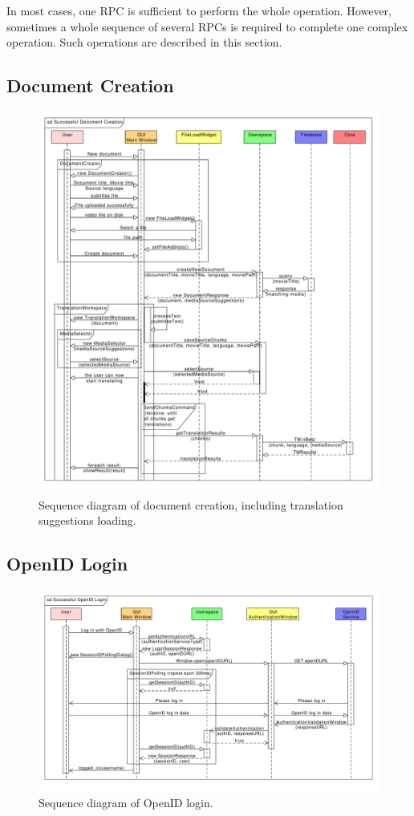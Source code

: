 In most cases, one RPC is sufficient to perform the whole operation. However, sometimes a whole sequence of several RPCs is required to complete one complex operation. Such operations are described in this section.

\subsection{Document Creation}

\begin{figure}[h]
\begin{center}
\includegraphics[scale=0.45]{figures/document_creation_sequence.pdf}
\end{center}
\caption{Sequence diagram of document creation, including translation suggestions loading.}\label{gui:sd:document_creation}
\end{figure}

\subsection{OpenID Login}

\begin{figure}[h]
\begin{center}
\includegraphics[scale=0.55, angle=90]{figures/openid_login_sequence.pdf}
\end{center}
\caption{Sequence diagram of OpenID login.}\label{gui:sd:openid_login}
\end{figure}
